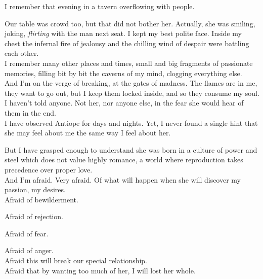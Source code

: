 \documentclass{report}
\begin{document}
I remember that evening in a tavern overflowing with people.

Our table was crowd too, but that did not bother her. Actually, she was smiling, joking, \emph{flirting} with the man next seat. I kept my best polite face. Inside my chest the infernal fire of jealousy and the chilling wind of despair were battling each other.\\

I remember many other places and times, small and big fragments of passionate memories, filling bit by bit the caverns of my mind, clogging everything else.\\

And I'm on the verge of breaking, at the gates of madness. The flames are in me, they want to go out, but I keep them locked inside, and so they consume my soul.\\

I haven't told anyone. Not her, nor anyone else, in the fear she would hear of them in the end.\\

I have observed Antiope for days and nights. Yet, I never found a single hint that she may feel about me the same way I feel about her.

But I have grasped enough to understand she was born in a culture of power and steel which does not value highly romance, a world where reproduction takes precedence over proper love.\\

And I'm afraid. Very afraid. Of what will happen when she will discover my passion, my desires.\\

Afraid of bewilderment.

Afraid of rejection.

Afraid of fear.

Afraid of anger.\\

Afraid this will break our special relationship.\\

Afraid that by wanting too much of her, I will lost her whole.\\
\end{document}
